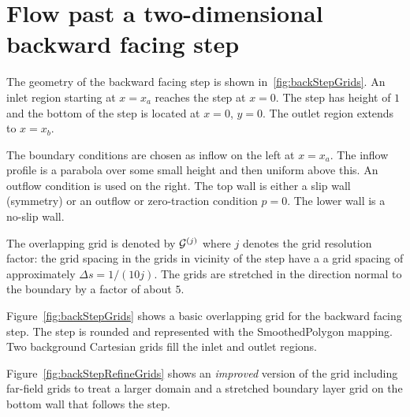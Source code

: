 \section{Flow past a two-dimensional backward facing step}

The geometry of the backward facing step is shown in~\ref{fig:backStepGrids}. 
An inlet region starting at $x=x_a$ reaches the step at $x=0$. The step has height of $1$ and the bottom
of the step is located at $x=0$, $y=0$. The outlet region extends to $x=x_b$. 

The boundary conditions are chosen as inflow on the left at $x=x_a$. The inflow profile is a parabola
over some small height and then uniform above this. An outflow condition is used on the right.
The top wall is either a slip wall (symmetry) or an outflow or zero-traction condition $p=0$. 
The lower wall is a no-slip wall.


The overlapping grid is denoted by ${\mathcal G}^{(j)}$ where $j$ denotes the grid resolution factor: the grid spacing in the 
grids in vicinity of the step have a a grid spacing of approximately $\Delta s = 1/(10 j)$. The grids are stretched
in the direction normal to the boundary by a factor of about $5$.

Figure~\ref{fig:backStepGrids} shows a basic overlapping grid for the backward facing step.
The step is rounded and represented with the SmoothedPolygon mapping.
Two background Cartesian grids fill the inlet and outlet regions.

Figure~\ref{fig:backStepRefineGrids} shows an {\em improved} version of the grid including far-field grids
to treat a larger domain and a stretched boundary layer grid on the bottom wall that follows the step.

